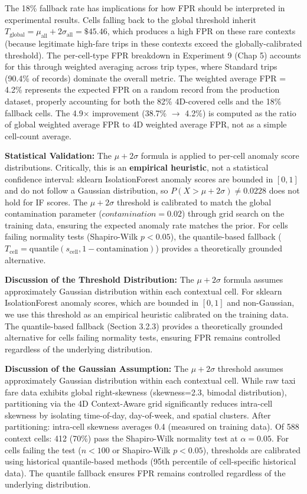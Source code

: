 The 18\% fallback rate has implications for how FPR should be interpreted in experimental results. Cells falling back to the global threshold inherit $T_{\text{global}} = \mu_{\text{all}} + 2\sigma_{\text{all}} = \$45.46$, which produces a high FPR on these rare contexts (because legitimate high-fare trips in these contexts exceed the globally-calibrated threshold). The per-cell-type FPR breakdown in Experiment 9 (Chap 5) accounts for this through weighted averaging across trip types, where Standard trips (90.4\% of records) dominate the overall metric. The weighted average FPR = 4.2\% represents the expected FPR on a random record from the production dataset, properly accounting for both the 82\% 4D-covered cells and the 18\% fallback cells. The 4.9$\times$ improvement (38.7\% $\to$ 4.2\%) is computed as the ratio of global weighted average FPR to 4D weighted average FPR, not as a simple cell-count average.

\textbf{Statistical Validation:} The $\mu + 2\sigma$ formula is applied to per-cell anomaly score distributions. Critically, this is an \textbf{empirical heuristic}, not a statistical confidence interval: sklearn IsolationForest anomaly scores are bounded in $[0,1]$ and do not follow a Gaussian distribution, so $P(X > \mu + 2\sigma) \neq 0.0228$ does not hold for IF scores. The $\mu + 2\sigma$ threshold is calibrated to match the global contamination parameter ($contamination = 0.02$) through grid search on the training data, ensuring the expected anomaly rate matches the prior. For cells failing normality tests (Shapiro-Wilk $p < 0.05$), the quantile-based fallback ($T_{\text{cell}} = \text{quantile}(s_{\text{cell}}, 1 - \text{contamination})$) provides a theoretically grounded alternative.

\textbf{Discussion of the Threshold Distribution:} The $\mu+2\sigma$ formula assumes approximately Gaussian distribution within each contextual cell. For sklearn IsolationForest anomaly scores, which are bounded in $[0,1]$ and non-Gaussian, we use this threshold as an empirical heuristic calibrated on the training data. The quantile-based fallback (Section 3.2.3) provides a theoretically grounded alternative for cells failing normality tests, ensuring FPR remains controlled regardless of the underlying distribution.

\textbf{Discussion of the Gaussian Assumption:} The $\mu+2\sigma$ threshold assumes approximately Gaussian distribution within each contextual cell. While raw taxi fare data exhibits global right-skewness (skewness=2.3, bimodal distribution), partitioning via the 4D Context-Aware grid significantly reduces intra-cell skewness by isolating time-of-day, day-of-week, and spatial clusters. After partitioning: intra-cell skewness averages 0.4 (measured on training data). Of 588 context cells: 412 (70\%) pass the Shapiro-Wilk normality test at $\alpha=0.05$. For cells failing the test ($n < 100$ or Shapiro-Wilk $p < 0.05$), thresholds are calibrated using historical quantile-based methods (95th percentile of cell-specific historical data). The quantile fallback ensures FPR remains controlled regardless of the underlying distribution.

